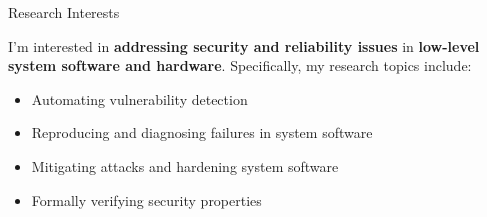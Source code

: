\begin{rSection}{Research Interests}
\newcommand{\eg}{\textit{e}.\textit{g}.\xspace}

I'm interested in \textbf{addressing security and reliability issues}
in \textbf{low-level system software and hardware}. Specifically, my
research topics include:

\begin{itemize}[leftmargin=*,itemsep=-5pt]
\item{Automating vulnerability detection}
\item{Reproducing and diagnosing failures in system software}
\item{Mitigating attacks and hardening system software}
\item{Formally verifying security properties}
\end{itemize}


\end{rSection}
